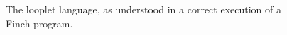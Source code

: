 \begin{figure}[ht]
\begin{tabular} {|p{0.65\linewidth}|c|}
\begin{minipage}[c]{0.25\linewidth}
    \end{minipage} \\\hline
\end{tabular}
\endgroup
\vspace{-8pt}
\caption{The looplet language, as understood in a correct execution of a Finch program.}
\end{figure}